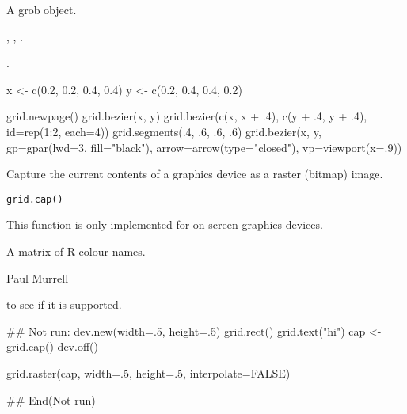 %
\begin{Value}
A grob object.
\end{Value}
%
\begin{SeeAlso}\relax
{},
,
.

.
\end{SeeAlso}
%
\begin{Examples}
\begin{ExampleCode}
x <- c(0.2, 0.2, 0.4, 0.4)
y <- c(0.2, 0.4, 0.4, 0.2)

grid.newpage()
grid.bezier(x, y)
grid.bezier(c(x, x + .4), c(y + .4, y + .4),
            id=rep(1:2, each=4))
grid.segments(.4, .6, .6, .6)
grid.bezier(x, y,
            gp=gpar(lwd=3, fill="black"),
            arrow=arrow(type="closed"),
            vp=viewport(x=.9))
\end{ExampleCode}
\end{Examples}
%
\begin{Description}\relax
Capture the current contents of a graphics device as a raster
(bitmap) image.
\end{Description}
%
\begin{Usage}
\begin{verbatim}
grid.cap()
\end{verbatim}
\end{Usage}
%
\begin{Details}\relax
This function is only implemented for on-screen graphics devices.
\end{Details}
%
\begin{Value}
A matrix of R colour names.
\end{Value}
%
\begin{Author}\relax
Paul Murrell
\end{Author}
%
\begin{SeeAlso}\relax
{}

 to see if it is supported.
\end{SeeAlso}
%
\begin{Examples}
\begin{ExampleCode}
## Not run: 
dev.new(width=.5, height=.5)
grid.rect()
grid.text("hi")
cap <- grid.cap()
dev.off()

grid.raster(cap, width=.5, height=.5, interpolate=FALSE)

## End(Not run)
\end{ExampleCode}
\end{Examples}
